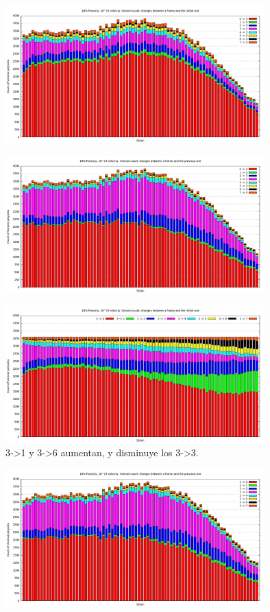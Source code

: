 \documentclass[10pt, oneside]{article} %
\begin{document}
\begin{figure}[H]
\centering
\includegraphics[width=10cm]{Figures/Porosidad_2vel_comp_voronoi_hist5.png}
\caption{}
\end{figure}

\begin{figure}[H]
\centering
\includegraphics[width=10cm]{Figures/Porosidad_2vel_comp_voronoi_hist6.png}
\caption{}
\end{figure}

\begin{figure}[H]
\centering
\includegraphics[width=10cm]{Figures/Porosidad_2vel_comp_voronoi_hist7.png}
\caption{3->1 y 3->6 aumentan, y disminuye los 3->3.}
\end{figure}

\begin{figure}[H]
\centering
\includegraphics[width=10cm]{Figures/Porosidad_2vel_comp_voronoi_hist8.png}
\caption{}
\label{fg:17comp}
\end{figure}
\end{document}
